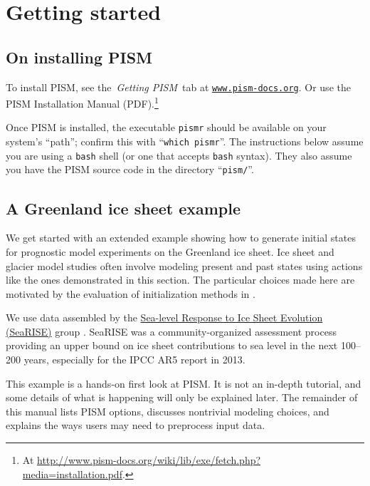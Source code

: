 
\section{Getting started}\label{sec:start}

\subsection{On installing PISM}

To install PISM, see the \,\emph{Getting PISM}\, tab at \href{http://www.pism-docs.org}{\texttt{www.pism-docs.org}}.  Or use the PISM Installation Manual (PDF).\footnote{At \url{http://www.pism-docs.org/wiki/lib/exe/fetch.php?media=installation.pdf}.}

Once PISM is installed, the executable \texttt{pismr} should be available on your system's ``path''; confirm this with ``\texttt{which pismr}''.  The instructions below assume you are using a \texttt{bash} shell (or one that accepts \texttt{bash} syntax).  They also assume you have the PISM source code in the directory ``\texttt{pism/}''.

\subsection{A Greenland ice sheet example}

We get started with an extended example showing how to generate initial states for prognostic model experiments on the Greenland ice sheet.  Ice sheet and glacier model studies often involve modeling present and past states using actions like the ones demonstrated in this section.  The particular choices made here are motivated by the evaluation of initialization methods in \cite{AschwandenAdalgeirsdottirKhroulev}.

We use data assembled by the \href{http://websrv.cs.umt.edu/isis/index.php/SeaRISE_Assessment}{Sea-level Response to Ice Sheet Evolution (SeaRISE)} group \cite{Bindschadler2013SeaRISE}.  SeaRISE was a community-organized assessment process providing an upper bound on ice sheet contributions to sea level in the next 100--200 years, especially for the IPCC AR5 report in 2013.

This example is a hands-on first look at PISM.  It is not an in-depth tutorial, and some details of what is happening will only be explained later.  The remainder of this manual lists PISM options, discusses nontrivial modeling choices, and explains the ways users may need to preprocess input data.

